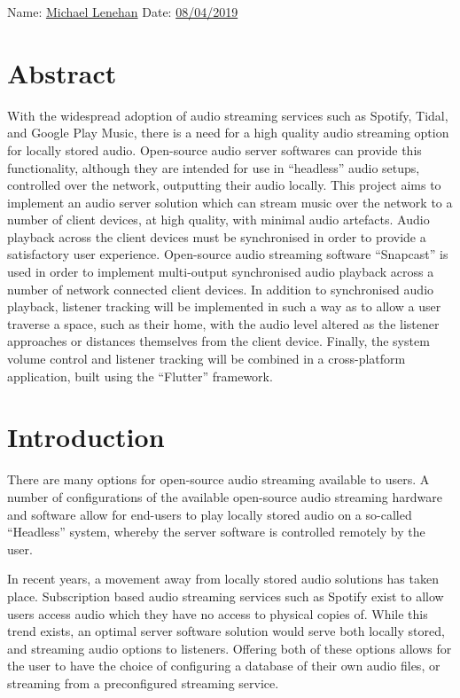 \documentclass[11pt,a4paper,headinclude=false,footinclude=false]{scrreprt}
\begin{document}
Name: \underline{Michael Lenehan} Date: \underline{08/04/2019}

\chapter{Abstract}\label{abstract}

With the widespread adoption of audio streaming services such as
Spotify, Tidal, and Google Play Music, there is a need for a high
quality audio streaming option for locally stored audio. Open-source
audio server softwares can provide this functionality, although they are
intended for use in ``headless'' audio setups, controlled over the
network, outputting their audio locally. This project aims to implement
an audio server solution which can stream music over the network to a
number of client devices, at high quality, with minimal audio artefacts.
Audio playback across the client devices must be synchronised in order
to provide a satisfactory user experience. Open-source audio streaming
software ``Snapcast'' is used in order to implement multi-output
synchronised audio playback across a number of network connected client
devices. In addition to synchronised audio playback, listener tracking
will be implemented in such a way as to allow a user traverse a space,
such as their home, with the audio level altered as the listener
approaches or distances themselves from the client device. Finally, the
system volume control and listener tracking will be combined in a
cross-platform application, built using the ``Flutter'' framework.

\chapter{Introduction}\label{introduction}

There are many options for open-source audio streaming available to
users. A number of configurations of the available open-source audio
streaming hardware and software allow for end-users to play locally
stored audio on a so-called ``Headless'' system, whereby the server
software is controlled remotely by the user.

In recent years, a movement away from locally stored audio solutions has
taken place\cite{SpotPay18}. Subscription based audio streaming services
such as Spotify exist to allow users access audio which they have no
access to physical copies of. While this trend exists, an optimal server
software solution would serve both locally stored, and streaming audio
options to listeners. Offering both of these options allows for the user
to have the choice of configuring a database of their own audio files,
or streaming from a preconfigured streaming service.
\end{document}

